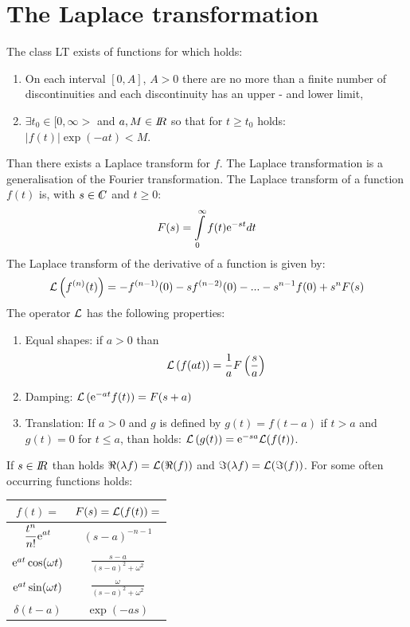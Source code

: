 \documentclass[twoside]{report}
\begin{document}
\section{The Laplace transformation}
The class LT exists of functions for which holds:
\begin{enumerate}
\item On each interval $[0,A]$, $A>0$ there are no more than a finite number of
      discontinuities and each discontinuity has an upper - and lower limit,
\item $\exists t_0\in[0,\infty>$ and $a,M\in I\hspace{-1mm}R$ so that for $t\geq t_0$
      holds: $|f(t)|\exp(-at)<M$.
\end{enumerate}
Than there exists a Laplace transform for $f$.
\npar
The Laplace transformation is a generalisation of the Fourier transformation.
The Laplace transform of a function $f(t)$ is, with $s\in\CC$ and $t\geq0$:
\[
F(s)=\int\limits_0^\infty f(t){\rm e}^{-st}dt
\]
The Laplace transform of the derivative of a function is given by:
\[
{\cal L}\left(f^{(n)}(t)\right)=-f^{(n-1)}(0)-sf^{(n-2)}(0)-...-s^{n-1}f(0)+s^nF(s)
\]
The operator $\cal L$ has the following properties:
\begin{enumerate}
\item Equal shapes: if $a>0$ than
\[
{\cal L}\left(f(at)\right)=\frac{1}{a}F\left(\frac{s}{a}\right)
\]
\item Damping: ${\cal L}\left({\rm e}^{-at}f(t)\right)=F(s+a)$
\item Translation: If $a>0$ and $g$ is defined by $g(t)=f(t-a)$ if
      $t>a$ and $g(t)=0$ for $t\leq a$, than holds:
      ${\cal L}\left(g(t)\right)={\rm e}^{-sa}{\cal L}(f(t))$.
\end{enumerate}
If $s\in I\hspace{-1mm}R$ than holds $\Re(\lambda f)={\cal L}(\Re(f))$ and
$\Im(\lambda f)={\cal L}(\Im(f))$.
\npar
For some often occurring functions holds:
\begin{center}
\begin{tabular}{||c||c||}
\hline
$f(t)=$&$F(s)={\cal L}(f(t))=$\\
\hline
\hline
$\displaystyle\frac{t^n}{n!}{\rm e}^{at}$&$(s-a)^{-n-1}$\rule{0pt}{15pt}\\
${\rm e}^{at}\cos(\omega t)$&$\displaystyle\frac{s-a}{(s-a)^2+\omega^2}$\rule{0pt}{15pt}\\
${\rm e}^{at}\sin(\omega t)$&$\displaystyle\frac{\omega}{(s-a)^2+\omega^2}$\rule{0pt}{15pt}\\
$\delta(t-a)$&$\exp(-as)$\rule{0pt}{13pt}\\
\hline
\end{tabular}
\end{center}
\end{document}
